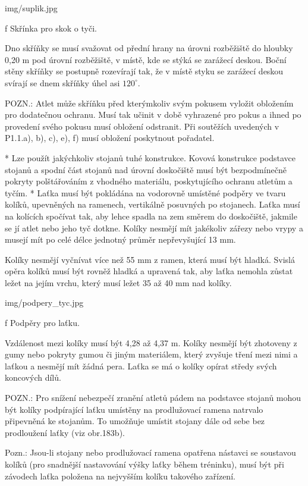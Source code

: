 \picw=8cm \inspic img/suplik.jpg
\caption/f Skřínka pro skok o tyči.

Dno skříňky se musí svažovat od přední hrany na úrovni rozběžiště do hloubky 0,20 m pod úrovní rozběžiště, v místě, kde se stýká se zarážecí deskou. Boční stěny skříňky se postupně rozevírají tak, že v místě styku se zarážecí deskou svírají se dnem skříňky úhel asi $120^\circ$.

POZN.: Atlet může skříňku před kterýmkoliv svým pokusem vyložit obložením pro dodatečnou ochranu. Musí tak učinit v době vyhrazené pro pokus a ihned po provedení svého pokusu musí obložení odstranit. Při soutěžích uvedených v P1.1.a), b), c), e), f) musí obložení poskytnout pořadatel.

* Lze použít jakýchkoliv stojanů tuhé konstrukce. Kovová konstrukce podstavce stojanů a spodní část stojanů nad úrovní doskočiště musí být bezpodmínečně pokryty polštářováním z vhodného materiálu, poskytujícího ochranu atletům a tyčím.
* Laťka musí být pokládána na vodorovně umístěné podpěry ve tvaru kolíků, upevněných na ramenech, vertikálně posuvných po stojanech. Laťka musí na kolících spočívat tak, aby lehce spadla na zem směrem do doskočiště, jakmile se jí atlet nebo jeho tyč dotkne. Kolíky nesmějí mít jakékoliv zářezy nebo vrypy a musejí mít po celé délce jednotný průměr nepřevyšující 13 mm.

Kolíky nesmějí vyčnívat více než 55 mm z ramen, která musí být hladká. Svislá opěra kolíků musí být rovněž hladká a upravená tak, aby laťka nemohla zůstat ležet na jejím vrchu, který musí ležet 35 až 40 mm nad kolíky.

\picw=8cm \inspic img/podpery_tyc.jpg
\caption/f Podpěry pro laťku.

Vzdálenost mezi kolíky musí být 4,28 až 4,37 m. Kolíky nesmějí být zhotoveny z gumy nebo pokryty gumou či jiným materiálem, který zvyšuje tření mezi nimi a laťkou a nesmějí mít žádná pera. Laťka se má o kolíky opírat středy svých koncových dílů.

POZN.: Pro snížení nebezpečí zranění atletů pádem na podstavce stojanů mohou být kolíky podpírající laťku umístěny na prodlužovací ramena natrvalo připevněná ke stojanům. To umožňuje umístit stojany dále od sebe bez prodloužení laťky (viz obr.183b).

Pozn.: Jsou-li stojany nebo prodlužovací ramena opatřena nástavci se soustavou kolíků (pro snadnější nastavování výšky laťky během tréninku), musí být při závodech laťka položena na nejvyšším kolíku takového zařízení.

